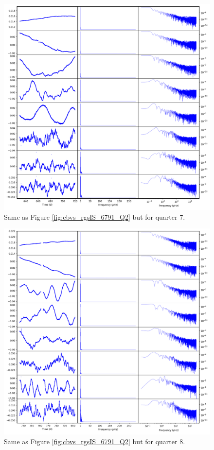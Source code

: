 \begin{figure}
    \centering
    \includegraphics[width=\linewidth]{Chapter_Appended/AppB/cbv_6791_rgs_q07.png}
    \caption{Same as Figure \ref{fig:cbvs_rgsIS_6791_Q2} but for quarter 7.}
    \label{fig:cbvs_rgsIS_6791_Q07}
\end{figure}


\begin{figure}
    \centering
    \includegraphics[width=\linewidth]{Chapter_Appended/AppB/cbv_6791_rgs_q08.png}
    \caption{Same as Figure \ref{fig:cbvs_rgsIS_6791_Q2} but for quarter 8.}
    \label{fig:cbvs_rgsIS_6791_Q08}
\end{figure}


